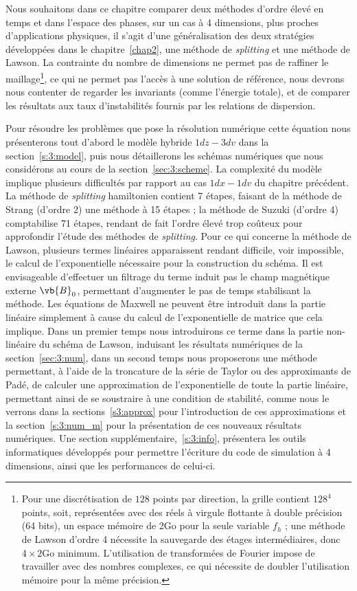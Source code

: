 Nous souhaitons dans ce chapitre comparer deux méthodes d'ordre élevé en temps et dans l'espace des phases, sur un cas à 4 dimensions, plus proches d'applications physiques, il s'agit d'une généralisation des deux stratégies développées dans le chapitre~\ref{chap2}, une méthode de \emph{splitting} et une méthode de Lawson. La contrainte du nombre de dimensions ne permet pas de raffiner le maillage\footnote{Pour une discrétisation de $128$ points par direction, la grille contient $128^4$ points, soit, représentées avec des réels à virgule flottante à double précision (64 bits), un espace mémoire de 2Go pour la seule variable $f_h$ ; une méthode de Lawson d'ordre 4 nécessite la sauvegarde des étages intermédiaires, donc $4\times 2\textrm{Go}$ minimum. L'utilisation de transformées de Fourier impose de travailler avec des nombres complexes, ce qui nécessite de doubler l'utilisation mémoire pour la même précision.}, ce qui ne permet pas l'accès à une solution de référence, nous devrons nous contenter de regarder les invariants (comme l'énergie totale), et de comparer les résultats aux taux d'instabilités fournis par les relations de dispersion.

Pour résoudre les problèmes que pose la résolution numérique cette équation nous présenterons tout d'abord le modèle hybride $1dz-3dv$ dans la section~\ref{s:3:model}, puis nous détaillerons les schémas numériques que nous considérons au cours de la section~\ref{sec:3:scheme}. La complexité du modèle implique plusieurs difficultés par rapport au cas $1dx-1dv$ du chapitre précédent. La méthode de \emph{splitting} hamiltonien contient 7 étapes, faisant de la méthode de Strang (d'ordre 2) une méthode à 15 étapes ; la méthode de Suzuki (d'ordre 4) comptabilise 71 étapes, rendant de fait l'ordre élevé trop coûteux pour approfondir l'étude des méthodes de \emph{splitting}. Pour ce qui concerne la méthode de Lawson, plusieurs termes linéaires apparaissent rendant difficile, voir impossible, le calcul de l'exponentielle nécessaire pour la construction du schéma. Il est envisageable d'effectuer un filtrage du terme induit pas le champ magnétique externe $\vb{B}_0$, permettant d'augmenter le pas de temps stabilisant la méthode. Les équations de Maxwell ne peuvent être introduit dans la partie linéaire simplement à cause du calcul de l'exponentielle de matrice que cela implique. Dans un premier temps nous introduirons ce terme dans la partie non-linéaire du schéma de Lawson, induisant les résultats numériques de la section~\ref{sec:3:num}, dans un second temps nous proposerons une méthode permettant, à l'aide de la troncature de la série de Taylor ou des approximants de Padé, de calculer une approximation de l'exponentielle de toute la partie linéaire, permettant ainsi de se soustraire à une condition de stabilité, comme nous le verrons dans la sections~\ref{s3:approx} pour l'introduction de ces approximations et la section~\ref{s:3:num_m} pour la présentation de ces nouveaux résultats numériques. Une section supplémentaire,~\ref{s:3:info}, présentera les outils informatiques développés pour permettre l'écriture du code de simulation à 4 dimensions, ainsi que les performances de celui-ci.